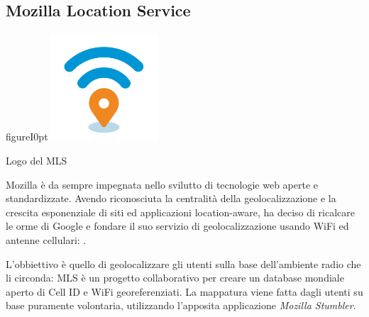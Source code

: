 \subsection{Mozilla Location Service}
\begin{wrapfloat}{figure}{I}{0pt}
	\centering
	\includegraphics[width=0.3\textwidth]{./Immagini/Dati/MLSlogo.png}
	\caption{Logo del MLS}
\end{wrapfloat}
Mozilla è da sempre impegnata nello svilutto di tecnologie web aperte e standardizzate. Avendo riconosciuta la centralità della geolocalizzazione e la crescita esponenziale di siti ed 
applicazioni location-aware, ha deciso di ricalcare le orme di Google e fondare il suo servizio di geolocalizzazione usando WiFi ed antenne cellulari: .


L'obbiettivo è quello di geolocalizzare gli utenti sulla base dell'ambiente radio che li circonda: MLS è un progetto collaborativo per creare un database mondiale aperto di Cell ID e WiFi georeferenziati. La mappatura viene fatta dagli utenti su base puramente volontaria, utilizzando l'apposita applicazione \emph{Mozilla Stumbler}.

